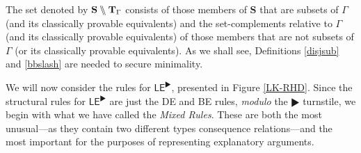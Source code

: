 \documentclass{article}
\theoremstyle{definition}
\theoremstyle{definition}
\theoremstyle{definition}
\theoremstyle{definition}
\theoremstyle{remark}
\theoremstyle{definition}
\theoremstyle{definition}
\begin{document}
The set denoted by $ \mathbf{S}\bbslash\mathbf{T}_{\Gamma} $ consists of those members of $ \mathbf{S} $ that are subsets of $ \Gamma $ (and its classically provable equivalents) and the set-complements relative to $ \Gamma $ (and its classically provable equivalents) of those members that are not subsets of $ \Gamma $ (or its classically provable equivalents). As we shall see, Definitions \ref{disjsub} and \ref{bbslash} are needed to secure minimality.





We will now consider the rules for $ \mathsf{LE^\RHD}$, presented in Figure \ref{LK-RHD}. Since the structural rules for $ \mathsf{LE}^\RHD $ are just the \textsf{DE} and \textsf{BE} rules, \textit{modulo} the $ \RHD $ turnstile, we begin with what we have called the \textit{Mixed Rules}. These are both the most unusual---as they contain two different types consequence relations---and the most important for the purposes of representing explanatory arguments.
\end{document}
